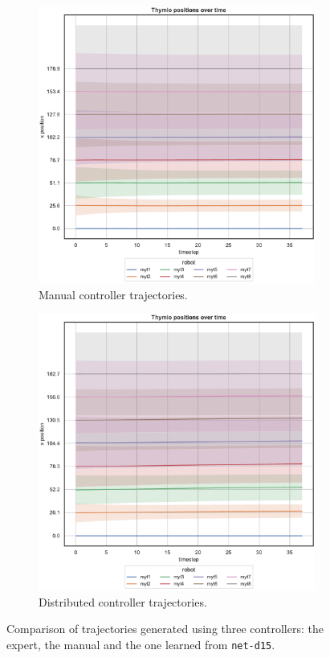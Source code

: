 \begin{figure}[!htb]\ContinuedFloat
	\begin{center}
		\begin{subfigure}[h]{0.49\textwidth}
			\centering			
			\includegraphics[width=.9\textwidth]{contents/images/net-d15/position-overtime-manual}%
			\caption{Manual controller trajectories.}
		\end{subfigure}
		\hfill
		\begin{subfigure}[h]{0.49\textwidth}
			\centering
			\includegraphics[width=.9\textwidth]{contents/images/net-d15/position-overtime-learned_distributed}
			\caption{Distributed controller trajectories.}
		\end{subfigure}
	\end{center}
	\caption[]{Comparison 
		of trajectories generated using three controllers: the expert, the manual 
		and the one learned from \texttt{net-d15}.}
	\label{fig:net-d15traj}
\end{figure}


